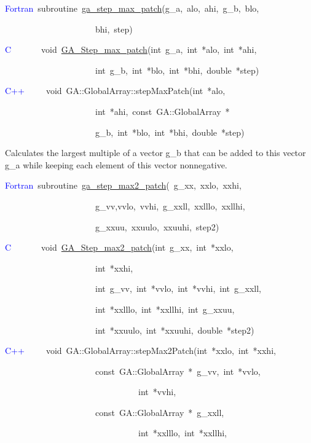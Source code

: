 \textcolor{blue}{Fortran}~subroutine~\href{https://hpc.pnl.gov/globalarrays/api/f_op_api.html\#ga_step_max_patch}{ga\_{}step\_{}max\_{}patch}(g\_a,~alo,~ahi,~g\_b,~blo,

~~~~~~~~~~~~~~~~~~~~~bhi,~step)~

\textcolor{blue}{C}~~~~~~~void~\href{https://hpc.pnl.gov/globalarrays/api/c_op_api.html\#ga_step_max_patch}{GA\_{}Step\_{}max\_{}patch}(int~g\_a,~int~{*}alo,~int~{*}ahi,~

~~~~~~~~~~~~~~~~~~~~~int~g\_b,~int~{*}blo,~int~{*}bhi,~double~{*}step)

\textcolor{blue}{C++}~~~~~void~GA::GlobalArray::stepMaxPatch(int~{*}alo,~

~~~~~~~~~~~~~~~~~~~~~int~{*}ahi,~const~GA::GlobalArray~{*}~

~~~~~~~~~~~~~~~~~~~~~g\_b,~int~{*}blo,~int~{*}bhi,~double~{*}step)

Calculates the largest multiple of a vector g\_b that can be added
to this vector g\_a while keeping each element of this vector nonnegative. 

\textcolor{blue}{Fortran}~subroutine~\href{https://hpc.pnl.gov/globalarrays/api/f_op_api.html\#ga_step_max2_patch}{ga\_{}step\_{}max2\_{}patch}(~g\_xx,~xxlo,~xxhi,~

~~~~~~~~~~~~~~~~~~~~~g\_vv,vvlo,~vvhi,~g\_xxll,~xxlllo,~xxllhi,~

~~~~~~~~~~~~~~~~~~~~~g\_xxuu,~xxuulo,~xxuuhi,~step2)~

\textcolor{blue}{C}~~~~~~~void~\href{https://hpc.pnl.gov/globalarrays/api/c_op_api.html\#ga_step_max2_patch}{GA\_{}Step\_{}max2\_{}patch}(int~g\_xx,~int~{*}xxlo,~

~~~~~~~~~~~~~~~~~~~~~int~{*}xxhi,

~~~~~~~~~~~~~~~~~~~~~int~g\_vv,~int~{*}vvlo,~int~{*}vvhi,~int~g\_xxll,~

~~~~~~~~~~~~~~~~~~~~~int~{*}xxlllo,~int~{*}xxllhi,~int~g\_xxuu,~

~~~~~~~~~~~~~~~~~~~~~int~{*}xxuulo,~int~{*}xxuuhi,~double~{*}step2)~

\textcolor{blue}{C++}~~~~~void~GA::GlobalArray::stepMax2Patch(int~{*}xxlo,~int~{*}xxhi,

~~~~~~~~~~~~~~~~~~~~~const~GA::GlobalArray~{*}~g\_vv,~int~{*}vvlo,~

~~~~~~~~~~~~~~~~~~~~~~~~~~~~~~~int~{*}vvhi,~

~~~~~~~~~~~~~~~~~~~~~const~GA::GlobalArray~{*}~g\_xxll,~

~~~~~~~~~~~~~~~~~~~~~~~~~~~~~~~int~{*}xxlllo,~int~{*}xxllhi,~

